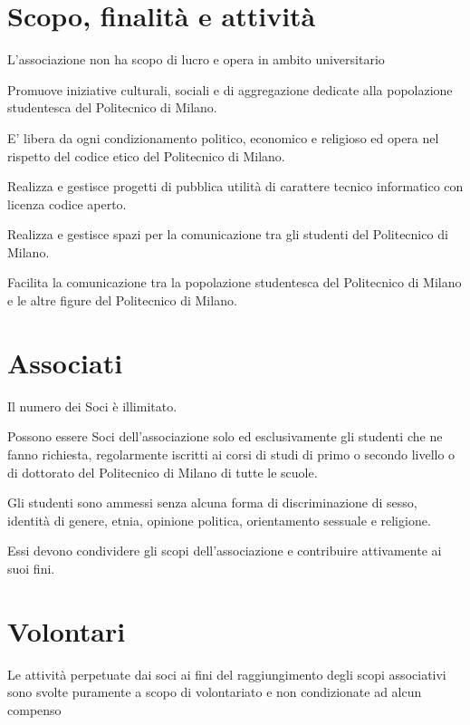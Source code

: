 \documentclass[legalpaper, 11pt]{exam}
\let\tempone\enumerate
\let\temptwo\endenumerate
\renewenvironment{enumerate}{\tempone\addtolength{\itemsep}{-0.45\baselineskip}}{\temptwo}
\begin{document}
\section{Scopo, finalità e attività}
\begin{enumerate}
 \item L’associazione non ha scopo di lucro e opera in ambito universitario
 \item Promuove iniziative culturali, sociali e di aggregazione dedicate alla popolazione studentesca del Politecnico di Milano.
 \item E’ libera da ogni condizionamento politico, economico e religioso ed opera nel rispetto del codice etico del Politecnico di Milano.
 \item Realizza e gestisce progetti di pubblica utilità di carattere tecnico informatico con licenza codice aperto.
 \item Realizza e gestisce spazi per la comunicazione tra gli studenti del Politecnico di Milano.
 \item Facilita la comunicazione tra la popolazione studentesca del Politecnico di Milano e le altre figure del Politecnico di Milano.
\end{enumerate}

\section{Associati}
\begin{enumerate}
 \item Il numero dei Soci è illimitato. 
 \item Possono essere Soci dell’associazione solo ed esclusivamente gli studenti che ne fanno richiesta, regolarmente iscritti ai corsi di studi di primo o secondo livello o di dottorato del Politecnico di Milano di tutte le scuole.
 \item Gli studenti sono ammessi senza alcuna forma di discriminazione di sesso, identità di genere, etnia, opinione politica, orientamento sessuale e religione.
 \item Essi devono condividere gli scopi dell’associazione e contribuire attivamente ai suoi fini.
\end{enumerate}

\section{Volontari}
\begin{enumerate}
    \item Le attività perpetuate dai soci ai fini del raggiungimento degli scopi associativi sono svolte puramente a scopo di volontariato e non condizionate ad alcun compenso
\end{enumerate}
\end{document}
